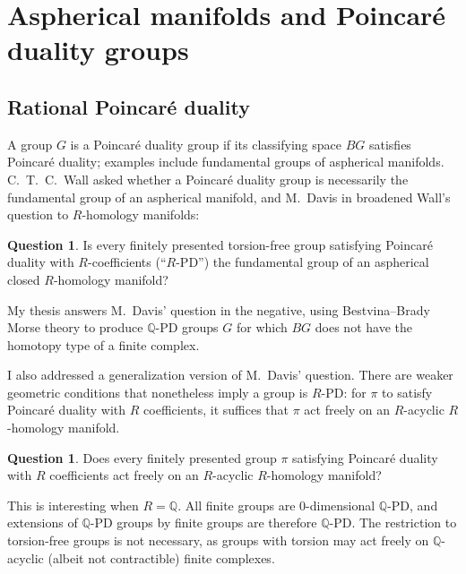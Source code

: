 \documentclass[12pt]{amsart}
\theoremstyle{definition}
\newtheorem{question}[theorem]{Question}
\newcommand{\Q}{\mathbb{Q}}
\begin{document}
\newpage
\section{Aspherical manifolds and Poincar\'e duality groups}
\label{section:aspherical-manifolds}

\subsection{Rational Poincar\'e duality}
\label{subsection:rational-poincare-duality}
A group $G$ is a Poincar\'e duality group if its classifying space
$BG$ satisfies Poincar\'e duality; examples include fundamental groups
of aspherical manifolds.  C.~T.~C.~Wall asked whether a Poincar\'e
duality group is necessarily the fundamental group of an aspherical
manifold, and M.~Davis in \cite{MR1747535} broadened Wall's question to
$R$-homology manifolds:
\begin{question}
Is every finitely presented torsion-free group satisfying Poincar\'e
duality with $R$-coefficients (``$R$-PD'') the fundamental group of an
aspherical closed $R$-homology manifold?
\end{question}
\noindent
My thesis answers M.~Davis' question in the negative, using
Bestvina--Brady Morse theory to produce $\Q$-PD groups $G$ for which
$BG$ does not have the homotopy type of a finite complex.

I also addressed a generalization version of M.~Davis' question.
There are weaker geometric conditions that nonetheless imply a group
is $R$-PD: for $\pi$ to satisfy Poincar\'e duality with $R$
coefficients, it suffices that $\pi$ act freely on an $R$-acyclic
$R$-homology manifold.
\begin{question}
  Does every finitely presented group $\pi$ satisfying Poincar\'e
  duality with $R$ coefficients act freely on an $R$-acyclic
  $R$-homology manifold?
\end{question}
\noindent
This is interesting when $R = \Q$.  All finite groups are
$0$-dimensional $\Q$-PD, and extensions of $\Q$-PD groups by finite
groups are therefore $\Q$-PD.  The restriction to torsion-free groups
is not necessary, as groups with torsion may act freely on $\Q$-acyclic
(albeit not contractible) finite complexes.
\end{document}
